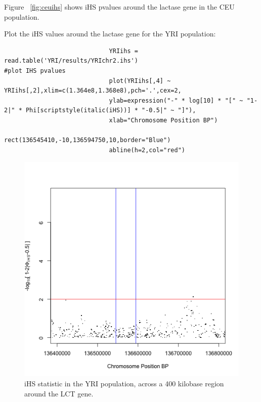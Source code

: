 \documentclass[a4paper,10pt]{article}
\begin{document}
                             \noindent
                             Figure ~\ref{fig:ceuihs} shows iHS pvalues around the lactase gene in the CEU population.

                             \noindent
                             Plot the iHS values around the lactase gene for the YRI population:\\
                             \begin{verbatim}
                             YRIihs = read.table('YRI/results/YRIchr2.ihs')
#plot IHS pvalues
                             plot(YRIihs[,4] ~ YRIihs[,2],xlim=c(1.364e8,1.368e8),pch='.',cex=2,
                             ylab=expression("-" * log[10] * "[" ~ "1-2|" * Phi[scriptstyle(italic(iHS))] * "-0.5|" ~ "]"),
                             xlab="Chromosome Position BP") 
                             rect(136545410,-10,136594750,10,border="Blue") 
                             abline(h=2,col="red")
                             \end{verbatim}

                             \begin{figure}
                             \centering
                             \includegraphics{pictures/YRIihs.png}
                             \caption{iHS statistic in the YRI population, across a 400 kilobase region around the LCT gene. }
                             \label{fig:yriihs}
                             \end{figure}
\end{document}
